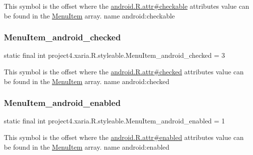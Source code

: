 This symbol is the offset where the \hyperlink{}{android.\+R.\+attr\#checkable} attribute\textquotesingle{}s value can be found in the \hyperlink{classproject4_1_1xaria_1_1R_1_1styleable_a8a573827fcaba6497e560662224b5530}{Menu\+Item} array.  name android\+:checkable \mbox{\label{classproject4_1_1xaria_1_1R_1_1styleable_aab5272133c6c4ac6e0192fd2732a95b7}} 
\subsubsection{\texorpdfstring{Menu\+Item\+\_\+android\+\_\+checked}{MenuItem\_android\_checked}}
{\footnotesize\ttfamily static final int project4.\+xaria.\+R.\+styleable.\+Menu\+Item\+\_\+android\+\_\+checked = 3\hspace{0.3cm}{\ttfamily [static]}}

This symbol is the offset where the \hyperlink{}{android.\+R.\+attr\#checked} attribute\textquotesingle{}s value can be found in the \hyperlink{classproject4_1_1xaria_1_1R_1_1styleable_a8a573827fcaba6497e560662224b5530}{Menu\+Item} array.  name android\+:checked \mbox{\label{classproject4_1_1xaria_1_1R_1_1styleable_a020dd31aa0835cbf2154f437b30f8112}} 
\subsubsection{\texorpdfstring{Menu\+Item\+\_\+android\+\_\+enabled}{MenuItem\_android\_enabled}}
{\footnotesize\ttfamily static final int project4.\+xaria.\+R.\+styleable.\+Menu\+Item\+\_\+android\+\_\+enabled = 1\hspace{0.3cm}{\ttfamily [static]}}

This symbol is the offset where the \hyperlink{}{android.\+R.\+attr\#enabled} attribute\textquotesingle{}s value can be found in the \hyperlink{classproject4_1_1xaria_1_1R_1_1styleable_a8a573827fcaba6497e560662224b5530}{Menu\+Item} array.  name android\+:enabled \mbox{\label{classproject4_1_1xaria_1_1R_1_1styleable_a628a1007379fdf99ddcec87c55a86e35}} 
